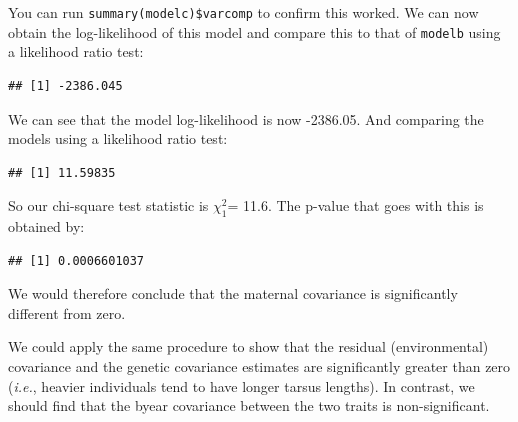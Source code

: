 \documentclass[
  12pt,
]{book}
\newenvironment{Shaded}{\begin{snugshade}}{\end{snugshade}}
\newcommand{\DecValTok}[1]{\textcolor[rgb]{0.00,0.00,0.81}{#1}}
\newcommand{\FunctionTok}[1]{\textcolor[rgb]{0.00,0.00,0.00}{#1}}
\newcommand{\NormalTok}[1]{#1}
\newcommand{\SpecialCharTok}[1]{\textcolor[rgb]{0.00,0.00,0.00}{#1}}
\begin{document}
You can run \texttt{summary(modelc)\$varcomp} to confirm this worked. We can now obtain the log-likelihood of this model and compare this to that of \texttt{modelb} using a likelihood ratio test:

\begin{Shaded}
\end{Shaded}

\begin{verbatim}
## [1] -2386.045
\end{verbatim}

We can see that the model log-likelihood is now -2386.05.
And comparing the models using a likelihood ratio test:

\begin{Shaded}
\end{Shaded}

\begin{verbatim}
## [1] 11.59835
\end{verbatim}

So our chi-square test statistic is \(\chi^2_1\)= 11.6.
The p-value that goes with this is obtained by:

\begin{Shaded}
\end{Shaded}

\begin{verbatim}
## [1] 0.0006601037
\end{verbatim}

We would therefore conclude that the maternal covariance is significantly different from zero.

We could apply the same procedure to show that the residual (environmental) covariance and the genetic covariance estimates are significantly greater than zero (\emph{i.e.}, heavier individuals tend to have longer tarsus lengths). In contrast, we should find that the byear covariance between the two traits is non-significant.
\end{document}

